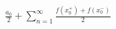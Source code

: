 \documentclass[preview]{standalone}
\begin{document}
\begin{center}
$\displaystyle{\frac{a_0}{2}+\sum\limits_{n=1}^{\infty}\frac{f(x_0^+)+f(x_0^-)}{2}}$
\end{center}
\end{document}
